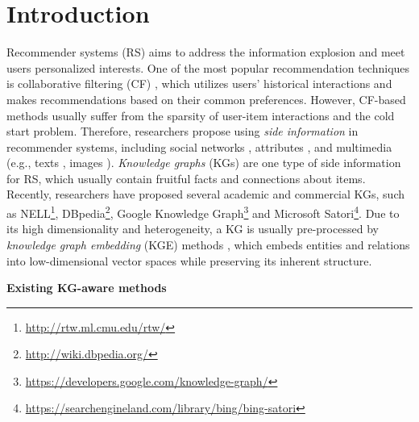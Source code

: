 \documentclass[sigconf]{acmart}
\begin{document}
\section{Introduction}
	Recommender systems (RS) aims to address the information explosion and meet users personalized interests.
	One of the most popular recommendation techniques is collaborative filtering (CF) \cite{koren2009matrix}, which utilizes users' historical interactions and makes recommendations based on their common preferences.
	However, CF-based methods usually suffer from the sparsity of user-item interactions and the cold start problem.
	Therefore, researchers propose using \textit{side information} in recommender systems, including social networks \cite{jamali2010matrix}, attributes \cite{wang2018shine}, and multimedia (e.g., texts \cite{wang2015collaborative}, images \cite{zhang2016collaborative}).
	\textit{Knowledge graphs} (KGs) are one type of side information for RS, which usually contain fruitful facts and connections about items.
	Recently, researchers have proposed several academic and commercial KGs, such as NELL\footnote{\url{http://rtw.ml.cmu.edu/rtw/}}, DBpedia\footnote{\url{http://wiki.dbpedia.org/}}, Google Knowledge Graph\footnote{\url{https://developers.google.com/knowledge-graph/}} and Microsoft Satori\footnote{\url{https://searchengineland.com/library/bing/bing-satori}}.
	Due to its high dimensionality and heterogeneity, a KG is usually pre-processed by \textit{knowledge graph embedding} (KGE) methods \cite{wang2018graphgan}, which embeds entities and relations into low-dimensional vector spaces while preserving its inherent structure.
	
	\vspace{0.5em}
	\noindent\textbf{Existing KG-aware methods}
	
\end{document}
